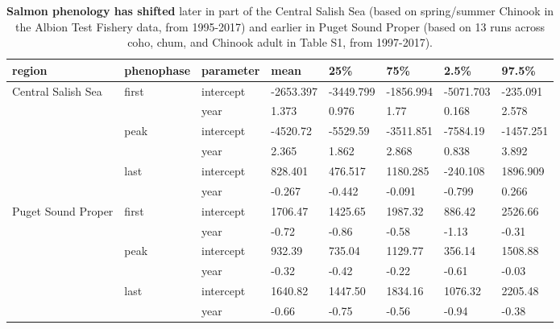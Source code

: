 \documentclass{article}
\begin{document}
\begin{table}[ht]
\centering
\caption{\textbf{Salmon phenology has shifted} later in part of the Central Salish Sea (based on spring/summer Chinook in the Albion Test Fishery data, from 1995-2017) and earlier in Puget Sound Proper (based on 13 runs across coho, chum, and Chinook adult in Table S1, from 1997-2017).} 
\label{tab:salmtren}
\begingroup\footnotesize
\begin{tabular}{|p{}|p{}p{}p{}p{}p{}p{}p{}|}
  \hline
region & phenophase & parameter & mean & 25\% & 75\% & 2.5\% & 97.5\% \\ 
  \hline
Central Salish Sea & first & intercept & -2653.397 & -3449.799 & -1856.994 & -5071.703 & -235.091 \\ 
   &  & year & 1.373 & 0.976 & 1.77 & 0.168 & 2.578 \\ 
   & peak & intercept & -4520.72 & -5529.59 & -3511.851 & -7584.19 & -1457.251 \\ 
   &  & year & 2.365 & 1.862 & 2.868 & 0.838 & 3.892 \\ 
   & last & intercept & 828.401 & 476.517 & 1180.285 & -240.108 & 1896.909 \\ 
   &  & year & -0.267 & -0.442 & -0.091 & -0.799 & 0.266 \\ 
   \hline
Puget Sound Proper & first & intercept & 1706.47 & 1425.65 & 1987.32 &  886.42 & 2526.66 \\ 
   &  & year & -0.72 & -0.86 & -0.58 & -1.13 & -0.31 \\ 
   & peak & intercept &  932.39 &  735.04 & 1129.77 &  356.14 & 1508.88 \\ 
   &  & year & -0.32 & -0.42 & -0.22 & -0.61 & -0.03 \\ 
   & last & intercept & 1640.82 & 1447.50 & 1834.16 & 1076.32 & 2205.48 \\ 
   &  & year & -0.66 & -0.75 & -0.56 & -0.94 & -0.38 \\ 
   \hline
\end{tabular}
\endgroup
\end{table}%
\end{document}
